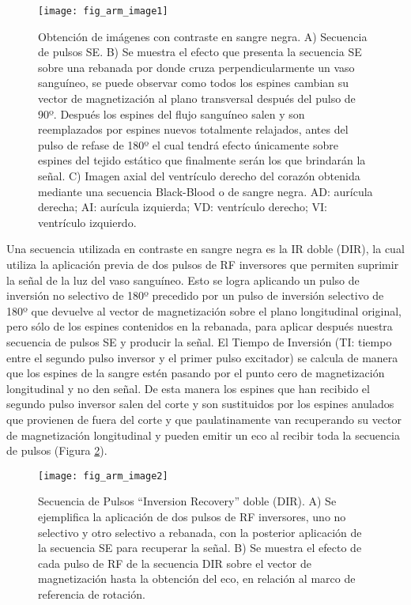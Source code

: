 \begin{figure}[htb]
\begin{figg}
 \texttt{[image: fig\_arm\_image1]}
 \caption{Obtención de imágenes con contraste en sangre negra. A) Secuencia de pulsos SE. B) Se muestra el efecto que presenta la secuencia SE sobre una rebanada por donde cruza perpendicularmente un vaso sanguíneo, se puede observar como todos los espines cambian su vector de magnetización al plano transversal después del pulso de 90º. Después los espines del flujo sanguíneo salen y son reemplazados por espines nuevos totalmente relajados, antes del pulso de refase de 180º el cual tendrá efecto únicamente sobre espines del tejido estático que finalmente serán los que brindarán la señal. C) Imagen axial del ventrículo derecho del corazón obtenida mediante una secuencia Black-Blood o de sangre negra. AD: aurícula derecha; AI: aurícula izquierda; VD: ventrículo derecho; VI: ventrículo izquierdo.}
 \label{fig:arm_image1}
\end{figg}
\end{figure}



Una secuencia utilizada en contraste en sangre negra es la IR doble (DIR), la cual utiliza la aplicación previa de dos pulsos de RF inversores que permiten suprimir la señal de la luz del vaso sanguíneo. Esto se logra aplicando un pulso de inversión no selectivo de 180º precedido por un pulso de inversión selectivo de 180º que devuelve al vector de magnetización sobre el plano longitudinal original, pero sólo de los espines contenidos en la rebanada, para aplicar después nuestra secuencia de pulsos SE y producir la señal. El Tiempo de Inversión (TI: tiempo entre el segundo pulso inversor y el primer pulso excitador) se calcula de manera que los espines de la sangre estén pasando por el punto cero de magnetización longitudinal y no den señal. De esta manera los espines que han recibido el segundo pulso inversor salen del corte y son sustituidos por los espines anulados que provienen de fuera del corte y que paulatinamente van recuperando su vector de magnetización longitudinal y pueden emitir un eco al recibir toda la secuencia de pulsos (Figura \ref{fig:arm_image2}). 



\begin{figure}[htb]
\begin{figg}
 \texttt{[image: fig\_arm\_image2]}
 \caption{Secuencia de Pulsos ``Inversion Recovery'' doble (DIR). A) Se ejemplifica la aplicación de dos pulsos de RF inversores, uno no selectivo y otro selectivo a rebanada, con la posterior aplicación de la secuencia SE para recuperar la señal. B) Se muestra el efecto de cada pulso de RF de la secuencia DIR sobre el vector de magnetización hasta la obtención del eco, en relación al marco de referencia de rotación. }
 \label{fig:arm_image2}
\end{figg}
\end{figure}



